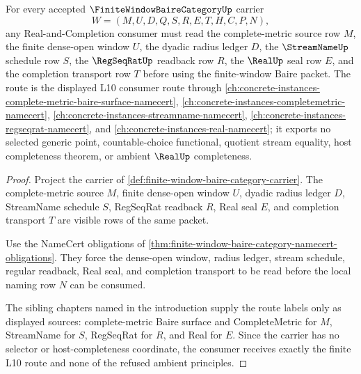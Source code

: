 \begin{theorem}
\label{thm:finite-window-baire-category-real-completion-consumer-route}
For every accepted $\FiniteWindowBaireCategoryUp$ carrier
$$
W=(M,U,D,Q,S,R,E,T,H,C,P,N),
$$
any Real-and-Completion consumer must read the complete-metric source row $M$, the finite dense-open window $U$, the dyadic radius ledger $D$, the $\StreamNameUp$ schedule row $S$, the $\RegSeqRatUp$ readback row $R$, the $\RealUp$ seal row $E$, and the completion transport row $T$ before using the finite-window Baire packet. The route is the displayed L10 consumer route through \autoref{ch:concrete-instances-complete-metric-baire-surface-namecert}, \autoref{ch:concrete-instances-completemetric-namecert}, \autoref{ch:concrete-instances-streamname-namecert}, \autoref{ch:concrete-instances-regseqrat-namecert}, and \autoref{ch:concrete-instances-real-namecert}; it exports no selected generic point, countable-choice functional, quotient stream equality, host completeness theorem, or ambient $\RealUp$ completeness.
\end{theorem}
\begin{proof}
Project the carrier of \autoref{def:finite-window-baire-category-carrier}. The complete-metric source $M$, finite dense-open window $U$, dyadic radius ledger $D$, StreamName schedule $S$, RegSeqRat readback $R$, Real seal $E$, and completion transport $T$ are visible rows of the same packet.

Use the NameCert obligations of \autoref{thm:finite-window-baire-category-namecert-obligations}. They force the dense-open window, radius ledger, stream schedule, regular readback, Real seal, and completion transport to be read before the local naming row $N$ can be consumed.

The sibling chapters named in the introduction supply the route labels only as displayed sources: complete-metric Baire surface and CompleteMetric for $M$, StreamName for $S$, RegSeqRat for $R$, and Real for $E$. Since the carrier has no selector or host-completeness coordinate, the consumer receives exactly the finite L10 route and none of the refused ambient principles.
\end{proof}


